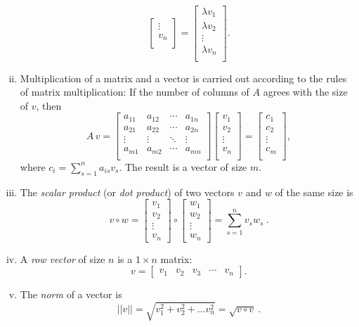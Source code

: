 \begin{definition}[Vectors]
\begin{enumerate}[(i)]
\[\begin{bmatrix}
		\vdots \\
		v_n \\
		\end{bmatrix} = \begin{bmatrix}
		\lambda v_1 \\
		\lambda v_2 \\
		\vdots \\
		\lambda v_n \\
		\end{bmatrix}. \]
	\item Multiplication of a matrix and a vector is carried out according to the rules of matrix multiplication: If the number of columns of $A$ agrees with the size of $v$, then
		\begin{equation*}
		A \, v =\begin{bmatrix}
		a_{11} & a_{12} & \cdots & a_{1n} \\
		a_{21} & a_{22} & \cdots & a_{2n} \\
		\vdots & \vdots & \ddots & \vdots \\
		a_{m1} & a_{m2} & \cdots & a_{mn} \\
		\end{bmatrix} \begin{bmatrix}
		v_1 \\
		v_2 \\
		\vdots \\
		v_n \\
		\end{bmatrix}
		= \begin{bmatrix}
		c_1 \\
		c_2 \\
		\vdots \\
		c_m \\
		\end{bmatrix},
		\end{equation*}
		where $c_i = \sum_{s=1}^n a_{is}v_{s}$. The result is a vector of size $m$.
	\item The \emph{scalar product} (or \emph{dot product}) of two vectors $v$ and $w$ of the same size is
		\[ v \circ w = \begin{bmatrix} v_1 \\ v_2 \\ \vdots \\ v_n \end{bmatrix} \circ
					   \begin{bmatrix} w_1 \\ w_2 \\ \vdots \\ w_n \end{bmatrix}
					   = \sum_{s=1}^n v_s w_s \:. \]
	\item A \emph{row vector} of size $n$ is a $1 \times n$ matrix:
	\[v = \begin{bmatrix}
	v_1 & v_2 & v_3 & \cdots & v_n \end{bmatrix}. \]
	\item The \emph{norm} of a vector is
	\[ ||v|| = \sqrt{v_1^2+v_2^2+ \dots v_n^2} = \sqrt{v \circ v} \:. \]
	\end{enumerate}
\end{definition}

